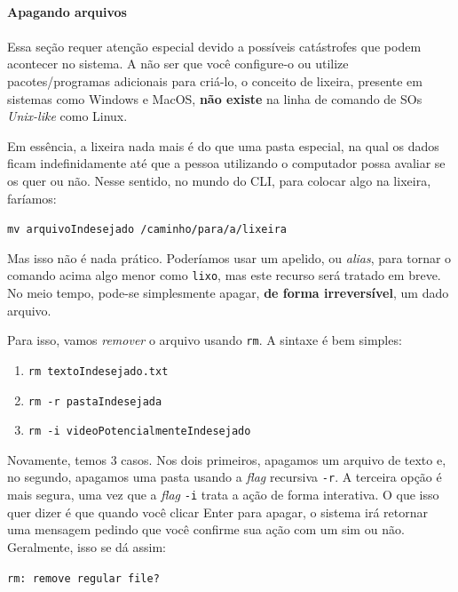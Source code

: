 \documentclass{article}
\begin{document}
	\paragraph{Apagando arquivos} 
	\paragraph{} 

	Essa seção requer atenção especial devido a possíveis catástrofes que podem acontecer no sistema. A não ser que você 
	configure-o ou utilize pacotes/programas adicionais para criá-lo, o conceito de lixeira, presente em sistemas
	como Windows e MacOS, \textbf{não existe} na linha de comando de SOs \textit{Unix-like} como Linux. 


	Em essência, a lixeira nada mais é do que uma pasta especial, na qual os dados ficam indefinidamente até que a pessoa
	utilizando o computador possa avaliar se os quer ou não. Nesse sentido, no mundo do CLI, para colocar algo na lixeira,
	faríamos: 
	
	\vspace{1ex} 
	\texttt{mv arquivoIndesejado /caminho/para/a/lixeira} 
	\vspace{1ex} 

	Mas isso não é nada prático. Poderíamos usar um apelido, ou \textit{alias}, para tornar o comando acima algo menor 
	como \texttt{lixo}, mas este recurso será tratado em breve. No meio tempo, pode-se simplesmente apagar,
	\textbf{de forma irreversível}, um dado arquivo. 

	Para isso, vamos \textit{remover} o arquivo usando \texttt{rm}. A sintaxe é bem simples: 
	\begin{enumerate} 
		\item{\texttt{rm textoIndesejado.txt}} 
		\item{\texttt{rm -r pastaIndesejada}} 
		\item{\texttt{rm -i videoPotencialmenteIndesejado}} 
	\end{enumerate}

	Novamente, temos 3 casos. Nos dois primeiros, apagamos um arquivo de texto e, no segundo, apagamos uma pasta usando 
	a \textit{flag} recursiva \texttt{-r}. A terceira opção é mais segura, uma vez que a \textit{flag} \texttt{-i} trata a ação de forma
	interativa. O que isso quer dizer é que quando você clicar Enter para apagar, o sistema irá retornar uma mensagem 
	pedindo que você confirme sua ação com um sim ou não. Geralmente, isso se dá assim:
	
	\vspace{1ex}
	\texttt{rm: remove regular file?} 
	\vspace{1ex} 
	
\end{document}
